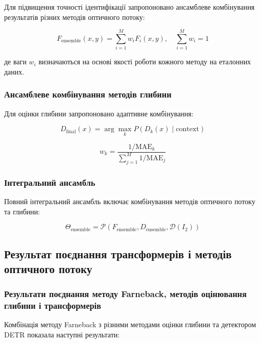\documentclass[14pt, a4paper]{extarticle}
\numberwithin{equation}{section}
\begin{document}
Для підвищення точності ідентифікації запропоновано ансамблеве комбінування результатів різних методів оптичного потоку:

\begin{equation}
F_{\text{ensemble}}(x,y) = \sum_{i=1}^{M} w_i F_i(x,y), \quad \sum_{i=1}^{M} w_i = 1 \tag{4.22}
\end{equation}

де ваги $w_i$ визначаються на основі якості роботи кожного методу на еталонних даних.

\subsubsection{Ансамблеве комбінування методів глибини}

Для оцінки глибини запропоновано адаптивне комбінування:

\begin{equation}
\boxed{D_{\text{final}}(x) = \arg\max_{k} P(D_k(x) \mid \text{context})} \tag{4.23}
\end{equation}

\begin{equation}
w_k = \frac{1/\text{MAE}_k}{\sum_{j=1}^{M} 1/\text{MAE}_j} \tag{4.24}
\end{equation}

\subsubsection{Інтегральний ансамбль}

Повний інтегральний ансамбль включає комбінування методів оптичного потоку та глибини:

\begin{equation}
\Theta_{\text{ensemble}} = \mathcal{P}\left(F_{\text{ensemble}}, D_{\text{ensemble}}, \mathcal{D}(I_2)\right) \tag{4.25}
\end{equation}

\subsection{Результат поєднання трансформерів і методів оптичного потоку}

\subsubsection{Результати поєднання методу Farneback, методів оцінювання глибини і трансформерів}

Комбінація методу Farneback з різними методами оцінки глибини та детектором DETR показала наступні результати:
\end{document}
